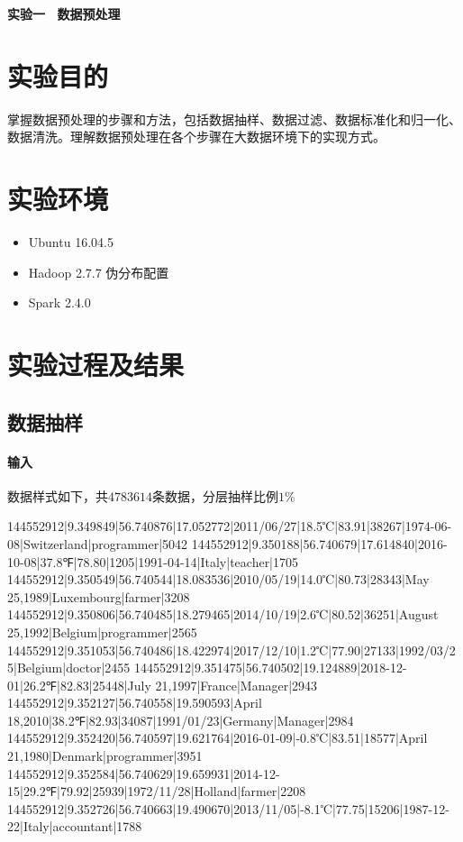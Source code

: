 \documentclass{ML}
\begin{document}
\maketitle

\newpage

\begin{center}
    \textbf{ 实验一 \  数据预处理}
\end{center}

\section{实验目的}
掌握数据预处理的步骤和方法，包括数据抽样、数据过滤、数据标准化和归一化、数据清洗。理解数据预处理在各个步骤在大数据环境下的实现方式。

\section{实验环境}
\begin{itemize}
    \item Ubuntu 16.04.5
    \item Hadoop 2.7.7 伪分布配置
    \item Spark 2.4.0
\end{itemize}
\section{实验过程及结果}
\subsection{数据抽样}
\paragraph{输入}数据样式如下，共$4783614$条数据，分层抽样比例$1\%$
\begin{textcode}
144552912|9.349849|56.740876|17.052772|2011/06/27|18.5℃|83.91|38267|1974-06-08|Switzerland|programmer|5042
144552912|9.350188|56.740679|17.614840|2016-10-08|37.8℉|78.80|1205|1991-04-14|Italy|teacher|1705
144552912|9.350549|56.740544|18.083536|2010/05/19|14.0℃|80.73|28343|May 25,1989|Luxembourg|farmer|3208
144552912|9.350806|56.740485|18.279465|2014/10/19|2.6℃|80.52|36251|August 25,1992|Belgium|programmer|2565
144552912|9.351053|56.740486|18.422974|2017/12/10|1.2℃|77.90|27133|1992/03/25|Belgium|doctor|2455
144552912|9.351475|56.740502|19.124889|2018-12-01|26.2℉|82.83|25448|July 21,1997|France|Manager|2943
144552912|9.352127|56.740558|19.590593|April 18,2010|38.2℉|82.93|34087|1991/01/23|Germany|Manager|2984
144552912|9.352420|56.740597|19.621764|2016-01-09|-0.8℃|83.51|18577|April 21,1980|Denmark|programmer|3951
144552912|9.352584|56.740629|19.659931|2014-12-15|29.2℉|79.92|25939|1972/11/28|Holland|farmer|2208
144552912|9.352726|56.740663|19.490670|2013/11/05|-8.1℃|77.75|15206|1987-12-22|Italy|accountant|1788
\end{textcode}
\end{document}
